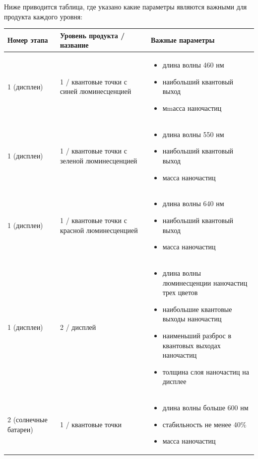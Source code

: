 Ниже приводится таблица, где указано какие параметры являются важными для продукта каждого уровня: 
\begin{longtable}{|p{3cm}|p{3cm}|p{8cm}|}
	\hline
	Номер этапа	& Уровень продукта / название & Важные параметры \\
	\hline
	1 (дисплеи)	& 1 / квантовые точки с синей люминесценцией	& \begin{itemize}
		\item длина волны 460 \textpm 15 нм
		\item наибольший квантовый выход
		\item мmасса наночастиц
		\end{itemize} \\
		\hline
	1 (дисплеи)	& 1 / квантовые точки с зеленой люминесценцией	& \begin{itemize} \item длина волны 550 \textpm 15 нм
		\item наибольший квантовый выход
		\item масса наночастиц \end{itemize} \\
		\hline
	1 (дисплеи)	&1 / квантовые точки с красной люминесценцией		& \begin{itemize} \item длина волны 640 \textpm 15 нм
		\item наибольший квантовый выход
		\item масса наночастиц \end{itemize} \\
		\hline
	1 (дисплеи)	&2 / дисплей & \begin{itemize} \item длина волны люминесценции наночастиц трех цветов
		\item наибольшие квантовые выходы наночастиц
		\item наименьший разброс в квантовых выходах наночастиц
		\item толщина слоя наночастиц на дисплее \end{itemize} \\
		\hline
	2 (солнечные батареи)	& 1 / квантовые точки		& \begin{itemize} \item длина волны больше 600 нм
			\item стабильность не менее 40\%
			\item масса наночастиц \end{itemize} \\
			\hline

\end{longtable}
